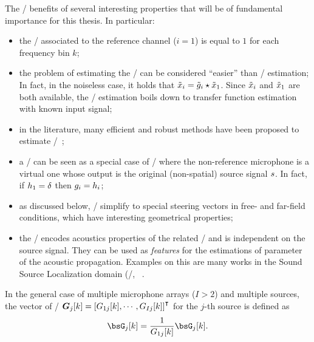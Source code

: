 \mynewline
The \ReTFs/ benefits of several interesting properties that will be of fundamental importance for this thesis.
In particular:
\begin{itemize}
    \item the \ReTF/ associated to the reference channel ($i = 1$) is equal to $1$ for each frequency bin $k$;
    \item the problem of estimating the \ReTF/ can be considered ``easier'' than \RIRs/ estimation;
    In fact, in the noiseless case, it holds that $\tilde{x}_i = \tilde{g}_i \star \tilde{x}_1$.
    Since $\tilde{x}_i$ and $\tilde{x}_1$ are both available, the \ReTF/ estimation boils down to transfer function estimation with known input signal;
    \item in the literature, many efficient and robust methods have been proposed to estimate \ReTFs/~;
    \item a \RIR/ can be seen as a special case of \ReTF/ where the non-reference microphone is a virtual one whose
    output is the original (non-spatial) source signal $s$. In fact, if $h_1 = \delta$ then $g_i = h_i$;
    \item as discussed below, \ReTFs/ simplify to special steering vectors in free- and far-field conditions, which have interesting geometrical properties;
    \item the \ReTF/ encodes acoustics properties of the related \RIRs/ and is independent on the source signal.
    They can be used as \textit{features} for the estimations of parameter of the acoustic propagation.
    Examples on this are many works in the Sound Source Localization domain (\eg/, ~.
\end{itemize}

\mynewline
In the general case of multiple microphone arrays ($I>2$) and multiple sources, the vector of \ReTFs/
$\boldsymbol{G}_j[k] = \ktranspose{\klist{{G}_ {1j}[k], \cdots, {G}_{Ij}[k]}}$
for the $j$-th source is defined as
\begin{equation}
    {\bsG}_j[k] = \frac{1}{{G}_{1j}[k]} {\bsG}_j[k]
    .
\end{equation}


